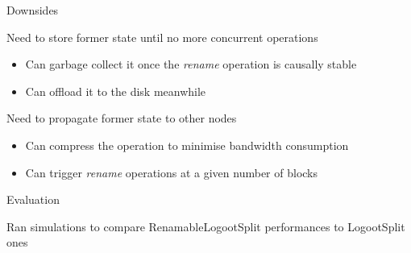 \documentclass[10pt]{beamer}
\begin{document}
\begin{frame}{Downsides}
  \begin{block}{Need to store former state until no more concurrent operations}
    \begin{itemize}
      \item Can garbage collect it once the \emph{rename} operation is causally stable 
      \item Can offload it to the disk meanwhile
    \end{itemize}
  \end{block}

  \begin{block}{Need to propagate former state to other nodes}
    \begin{itemize}
      \item Can compress the operation to minimise bandwidth consumption
      \item Can trigger \emph{rename} operations at a given number of blocks
    \end{itemize}
  \end{block}
\end{frame}


\begin{frame}[standout]
  \alert{Evaluation}

  \bigskip
  Ran simulations to compare RenamableLogootSplit performances to LogootSplit ones
\end{frame}


\end{document}
